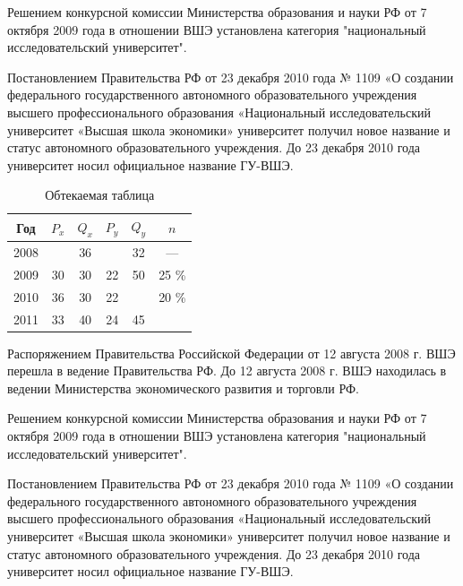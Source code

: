 \documentclass[a4paper,12pt]{article}
\begin{document}
Решением конкурсной комиссии Министерства образования и науки РФ от 7 октября 2009 года в отношении ВШЭ установлена категория "национальный исследовательский университет". 

Постановлением Правительства РФ от 23 декабря 2010 года № 1109 «О создании федерального государственного автономного образовательного учреждения высшего профессионального образования «Национальный исследовательский университет «Высшая школа экономики» университет получил новое название и статус автономного образовательного учреждения. До 23 декабря 2010 года университет носил официальное название ГУ-ВШЭ.

\begin{table}
  \begin{tabular}{|c|c|c|c|c|c|}
    \hline
    Год & $P_x$ &$Q_x$ & $P_y$ & $Q_y$ & $n$\\ \hline
    2008 &  & 36 &  & 32 & — \\ \hline
    2009 & 30 & 30 & 22 & 50 & 25 \% \\ \hline
    2010 & 36 & 30 & 22 &  & 20 \% \\ \hline
    2011 & 33 & 40 & 24 & 45 & \\ \hline
  \end{tabular}
  \caption{Обтекаемая таблица}
\end{table}
Распоряжением Правительства Российской Федерации от 12 августа 2008 г. ВШЭ перешла в ведение Правительства РФ. До 12 августа 2008 г. ВШЭ находилась в ведении Министерства экономического развития и торговли РФ.

Решением конкурсной комиссии Министерства образования и науки РФ от 7 октября 2009 года в отношении ВШЭ установлена категория "национальный исследовательский университет". 

Постановлением Правительства РФ от 23 декабря 2010 года № 1109 «О создании федерального государственного автономного образовательного учреждения высшего профессионального образования «Национальный исследовательский университет «Высшая школа экономики» университет получил новое название и статус автономного образовательного учреждения. До 23 декабря 2010 года университет носил официальное название ГУ-ВШЭ.

\listoffigures

\listoftables
\end{document}
